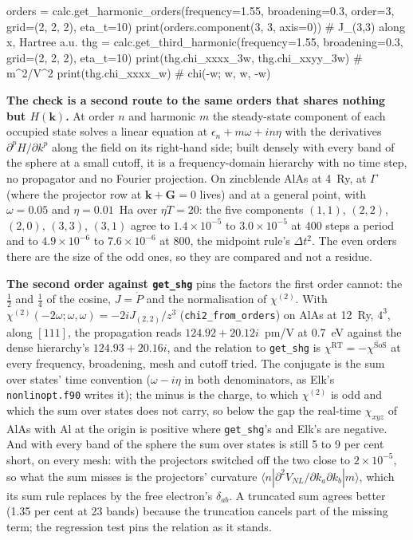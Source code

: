 \documentclass[11pt,a4paper]{article}
\newcommand{\code}[1]{\texttt{\small #1}}
\begin{document}
\begin{pycode}
orders = calc.get_harmonic_orders(frequency=1.55, broadening=0.3, order=3,
                                  grid=(2, 2, 2), eta_t=10)
print(orders.component(3, 3, axis=0))      # J_(3,3) along x, Hartree a.u.
thg = calc.get_third_harmonic(frequency=1.55, broadening=0.3, grid=(2, 2, 2),
                              eta_t=10)
print(thg.chi_xxxx_3w, thg.chi_xxyy_3w)    # m^2/V^2
print(thg.chi_xxxx_w)                      # chi(-w; w, w, -w)
\end{pycode}

\textbf{The check is a second route to the same orders that shares nothing but
$H(\mathbf k)$.} At order $n$ and harmonic $m$ the steady-state component of
each occupied state solves a linear equation at $\epsilon_n+m\omega+in\eta$ with
the derivatives $\partial^pH/\partial k^p$ along the field on its right-hand
side; built densely with every band of the sphere at a small cutoff, it is a
frequency-domain hierarchy with no time step, no propagator and no Fourier
projection. On zincblende AlAs at 4~Ry, at $\Gamma$ (where the projector row at
$\mathbf k+\mathbf G=0$ lives) and at a general point, with $\omega = 0.05$ and
$\eta = 0.01$~Ha over $\eta T = 20$: the five components $(1,1)$, $(2,2)$,
$(2,0)$, $(3,3)$, $(3,1)$ agree to $1.4\times10^{-5}$ to $3.0\times10^{-5}$ at 400
steps a period and to $4.9\times10^{-6}$ to $7.6\times10^{-6}$ at 800, the midpoint
rule's $\Delta t^2$. The even orders there are the size of the odd ones, so they
are compared and not a residue.

\textbf{The second order against \code{get\_shg}} pins the factors the
first order cannot: the $\tfrac12$ and $\tfrac14$ of the cosine, $J = \dot P$ and
the normalisation of $\chi^{(2)}$. With $\chi^{(2)}(-2\omega;\omega,\omega) =
-2iJ_{(2,2)}/z^3$ (\code{chi2\_from\_orders}) on AlAs at 12~Ry, $4^3$, along
$[111]$, the propagation reads $124.92+20.12i$~pm/V at 0.7~eV against the dense
hierarchy's $124.93+20.16i$, and the relation to \code{get\_shg} is
$\chi^{\mathrm{RT}} = -\overline{\chi^{\mathrm{SoS}}}$ at every frequency,
broadening, mesh and cutoff tried. The conjugate is the sum over states' time
convention ($\omega-i\eta$ in both denominators, as Elk's \code{nonlinopt.f90}
writes it); the minus is the charge, to which $\chi^{(2)}$ is odd and which the
sum over states does not carry, so below the gap the real-time $\chi_{xyz}$ of
AlAs with Al at the origin is positive where \code{get\_shg}'s and Elk's are
negative. And with every band of the sphere the sum over states is still 5 to 9
per cent short, on every mesh: with the projectors switched off the two close to
$2\times10^{-5}$, so what the sum misses is the projectors' curvature
$\langle n|\partial^2V_{NL}/\partial k_a\partial k_b|m\rangle$, which its sum
rule replaces by the free electron's $\delta_{ab}$. A truncated sum agrees better
(1.35 per cent at 23 bands) because the truncation cancels part of the missing
term; the regression test pins the relation as it stands.
\end{document}
